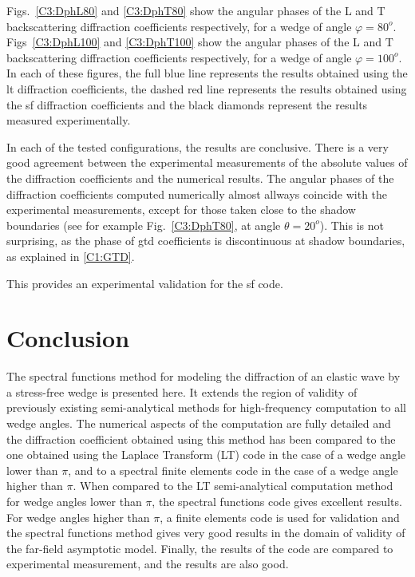 Figs.~\ref{C3:DphL80} and \ref{C3:DphT80} show the angular phases of the L and T backscattering diffraction coefficients respectively, for a wedge of angle $\varphi=80^o$. Figs~\ref{C3:DphL100} and \ref{C3:DphT100} show the angular phases of the L and T backscattering diffraction coefficients respectively, for a wedge of angle $\varphi=100^o$. In each of these figures, the full blue line represents the results obtained using the \acrshort{lt} diffraction coefficients, the dashed red line represents the results obtained using the \acrshort{sf} diffraction coefficients and the black diamonds represent the results measured experimentally.

In each of the tested configurations, the results are conclusive. There is a very good agreement between the experimental measurements of the absolute values of the diffraction coefficients and the numerical results. The angular phases of the diffraction coefficients computed numerically almost allways coincide with the experimental measurements, except for those taken close to the shadow boundaries (see for example Fig.~\ref{C3:DphT80}, at angle $\theta=20^o$). This is not surprising, as the phase of \acrshort{gtd} coefficients is discontinuous at shadow boundaries, as explained in \ref{C1:GTD}.

This provides an experimental validation for the \acrshort{sf} code.

\section*{Conclusion}
The spectral functions method for modeling the diffraction of an elastic wave by a stress-free wedge is presented here. It extends the region of validity of previously existing semi-analytical methods for high-frequency computation to all wedge angles. The numerical aspects of the computation are fully detailed and the diffraction coefficient obtained using this method has been compared to the one obtained using the Laplace Transform (LT) code in the case of a wedge angle lower than $\pi$, and to a spectral finite elements code in the case of a wedge angle higher than $\pi$. 
When compared to the LT semi-analytical computation method for wedge angles lower than $\pi$, the spectral functions code gives excellent results. For wedge angles higher than $\pi$, a finite elements code is used for validation and the spectral functions method gives very good results in the domain of validity of the far-field asymptotic model. Finally, the results of the code are compared to experimental measurement, and the results are also good.
